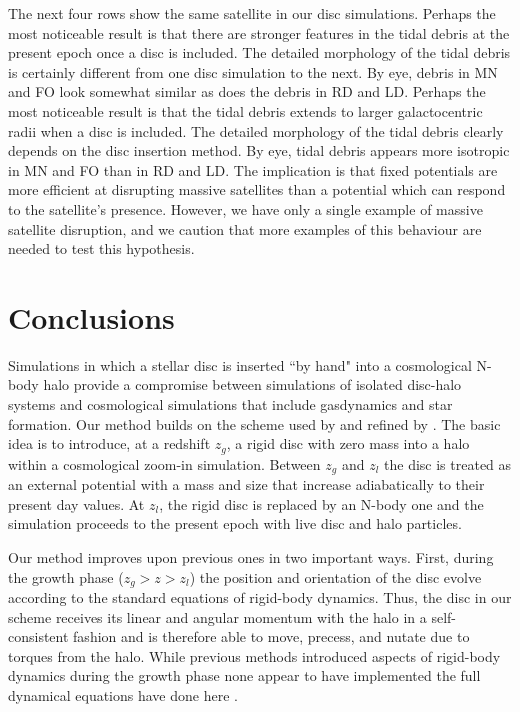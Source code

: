 The next four rows show the same satellite in our disc simulations.
Perhaps the most noticeable result is that there are stronger features
in the tidal debris at the present epoch once a disc is included.  The
detailed morphology of the tidal debris is certainly different from
one disc simulation to the next.  By eye, debris in MN and FO look
somewhat similar as does the debris in RD and LD. Perhaps the most
noticeable result is that the tidal debris extends to larger galactocentric
radii when a disc is included. The detailed morphology of the tidal debris
clearly depends on the disc insertion method. By eye, tidal debris appears
more isotropic in MN and FO than in RD and LD. The implication is that fixed
potentials are more efficient at disrupting massive satellites than a 
potential which can respond to the satellite's presence.  However, we have
only a single example of massive satellite disruption, and we caution that 
more examples of this behaviour are needed to test this hypothesis.


\section{Conclusions}

Simulations in which a stellar disc is inserted ``by hand" into a
cosmological N-body halo provide a compromise between simulations of
isolated disc-halo systems and cosmological simulations that include
gasdynamics and star formation.  Our method builds on the scheme
used by \citet{BerentzenShlosmanStellarDisks,DeBuhrStellarDisks} and refined by \citet{YurinSpringelStellarDisks}.  The basic idea is to introduce, at a redshift $z_g$,
a rigid disc with zero mass into a halo within a cosmological zoom-in
simulation.  Between $z_g$ and $z_l$ the disc is treated as an external
potential with a mass and size that increase adiabatically to their
present day values.  At $z_l$, the rigid disc is replaced by an N-body
one and the simulation proceeds to the present epoch with live disc
and halo particles.


Our method improves upon previous ones in two important ways.  First,
during the growth phase ($z_g > z > z_l$) the position and orientation
of the disc evolve according to the standard equations of rigid-body
dynamics.  Thus, the disc in our scheme receives its linear and angular
momentum with the halo in a self-consistent fashion and is therefore
able to move, precess, and nutate due to torques from the halo.  While
previous methods introduced aspects of rigid-body dynamics during the
growth phase none appear to have implemented the full dynamical
equations have done here \citep{DOhngiaSubstructureDepletion, DeBuhrStellarDisks, YurinSpringelStellarDisks}.


